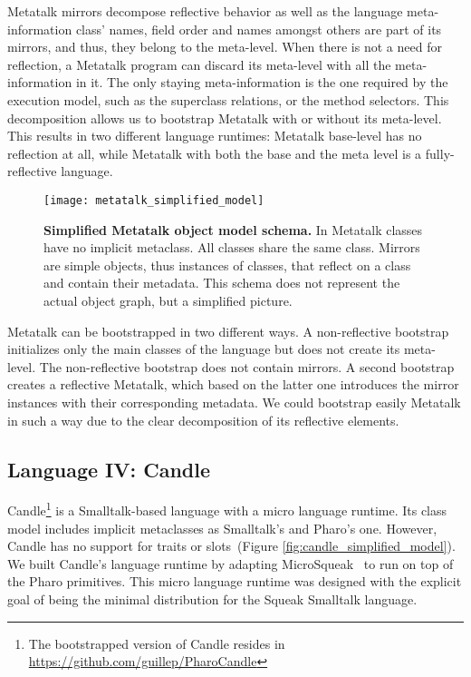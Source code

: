 Metatalk mirrors decompose reflective behavior as well as the language meta-information \ie class' names, field order and names amongst others are part of its mirrors, and thus, they belong to the meta-level. When there is not a need for reflection, a Metatalk program can discard its meta-level with all the meta-information in it. The only staying meta-information is the one required by the \VMs execution model, such as the superclass relations, or the method selectors. This decomposition allows us to bootstrap Metatalk with or without its meta-level. This results in two different language runtimes: Metatalk base-level has no reflection at all, while Metatalk with both the base and the meta level is a fully-reflective language.

\begin{figure}[ht]
\center
\texttt{[image: metatalk\_simplified\_model]}
\caption{\textbf{Simplified Metatalk object model schema.} In Metatalk classes have no implicit metaclass. All classes share the same class. Mirrors are simple objects, thus instances of classes, that reflect on a class and contain their metadata. This schema does not represent the actual object graph, but a simplified picture.\label{fig:metatalk_simplified_model}}
\end{figure}

Metatalk can be bootstrapped in two different ways. A non-reflective bootstrap initializes only the main classes of the language but does not create its meta-level. The non-reflective bootstrap does not contain mirrors. A second bootstrap creates a reflective Metatalk, which based on the latter one introduces the mirror instances with their corresponding metadata. We could bootstrap easily Metatalk in such a way due to the clear decomposition of its reflective elements. 

\subsection{Language IV: Candle} \label{sec:bootstrap_candle}

Candle\footnote{The bootstrapped version of Candle resides in \url{https://github.com/guillep/PharoCandle}} is a Smalltalk-based language with a micro language runtime. Its class model includes implicit metaclasses as Smalltalk's and Pharo's one. However, Candle has no support for traits or slots~(Figure \ref{fig:candle_simplified_model}). We built Candle's language runtime by adapting MicroSqueak~\cite{Malo11a} to run on top of the Pharo \VM primitives. This micro language runtime was designed with the explicit goal of being the minimal distribution for the Squeak Smalltalk language.


